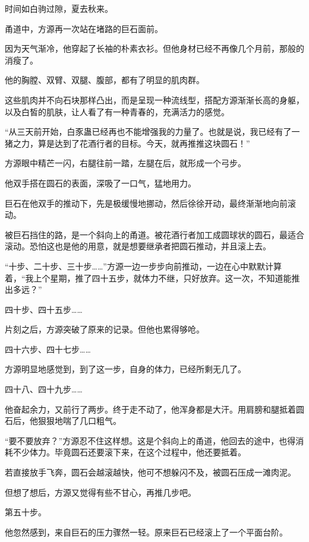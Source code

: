 
\begin{this_body}

时间如白驹过隙，夏去秋来。

甬道中，方源再一次站在堵路的巨石面前。

因为天气渐冷，他穿起了长袖的朴素衣衫。但他身材已经不再像几个月前，那般的消瘦了。

他的胸膛、双臂、双腿、腹部，都有了明显的肌肉群。

这些肌肉并不向石块那样凸出，而是呈现一种流线型，搭配方源渐渐长高的身躯，以及白皙的肌肤，让人看了有一种青春的，充满活力的感觉。

“从三天前开始，白豕蛊已经再也不能增强我的力量了。也就是说，我已经有了一猪之力，算是达到了花酒行者的目标。今天，就再推推这块圆石！”

方源眼中精芒一闪，右腿往前一踏，左腿在后，就形成一个弓步。

他双手搭在圆石的表面，深吸了一口气，猛地用力。

巨石在他双手的推动下，先是极缓慢地挪动，然后徐徐开动，最终渐渐地向前滚动。

被巨石挡住的路，是一个斜向上的甬道。被花酒行者加工成圆球状的圆石，最适合滚动。恐怕这也是他的用意，就是想要继承者把圆石推动，并且滚上去。

“十步、二十步、三十步……”方源一边一步步向前推动，一边在心中默默计算着，“我上个星期，推了四十五步，就体力不继，只好放弃。这一次，不知道能推出多远？”

四十步、四十五步……

片刻之后，方源突破了原来的记录。但他也累得够呛。

四十六步、四十七步……

方源明显地感觉到，到了这一步，自身的体力，已经所剩无几了。

四十八、四十九步……

他奋起余力，又前行了两步。终于走不动了，他浑身都是大汗。用肩膀和腿抵着圆石后，他狠狠地喘了几口粗气。

“要不要放弃？”方源忍不住这样想。这是个斜向上的甬道，他回去的途中，也得消耗不少体力。毕竟圆石还要滚下来，在这个过程中，他还要抵着。

若直接放手飞奔，圆石会越滚越快，他可不想躲闪不及，被圆石压成一滩肉泥。

但想了想后，方源又觉得有些不甘心，再推几步吧。

第五十步。

他忽然感到，来自巨石的压力骤然一轻。原来巨石已经滚上了一个平面台阶。


\end{this_body}
